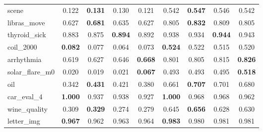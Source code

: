 \begin{figure}[ht]
\begin{tabular}{p{22mm}|*4{p{14mm}}|*4{p{14mm}}}
        scene&\multicolumn{1}{c}{0.122}&\multicolumn{1}{c}{\textbf{0.131}}&\multicolumn{1}{c}{0.130}&\multicolumn{1}{c|}{0.121}&\multicolumn{1}{c}{0.542}&\multicolumn{1}{c}{\textbf{0.547}}&\multicolumn{1}{c}{0.546}&\multicolumn{1}{c}{0.542}\\
        libras\_move&\multicolumn{1}{c}{0.627}&\multicolumn{1}{c}{\textbf{0.681}}&\multicolumn{1}{c}{0.635}&\multicolumn{1}{c|}{0.627}&\multicolumn{1}{c}{0.805}&\multicolumn{1}{c}{\textbf{0.832}}&\multicolumn{1}{c}{0.809}&\multicolumn{1}{c}{0.805}\\
        thyroid\_sick&\multicolumn{1}{c}{0.883}&\multicolumn{1}{c}{0.875}&\multicolumn{1}{c}{\textbf{0.894}}&\multicolumn{1}{c|}{0.892}&\multicolumn{1}{c}{0.938}&\multicolumn{1}{c}{0.934}&\multicolumn{1}{c}{\textbf{0.944}}&\multicolumn{1}{c}{0.943}\\
        coil\_2000&\multicolumn{1}{c}{\textbf{0.082}}&\multicolumn{1}{c}{0.077}&\multicolumn{1}{c}{0.064}&\multicolumn{1}{c|}{0.073}&\multicolumn{1}{c}{\textbf{0.524}}&\multicolumn{1}{c}{0.522}&\multicolumn{1}{c}{0.515}&\multicolumn{1}{c}{0.520}\\
        arrhythmia&\multicolumn{1}{c}{0.619}&\multicolumn{1}{c}{0.627}&\multicolumn{1}{c}{0.646}&\multicolumn{1}{c|}{\textbf{0.668}}&\multicolumn{1}{c}{0.801}&\multicolumn{1}{c}{0.805}&\multicolumn{1}{c}{0.815}&\multicolumn{1}{c}{\textbf{0.826}}\\
        solar\_flare\_m0&\multicolumn{1}{c}{0.020}&\multicolumn{1}{c}{0.019}&\multicolumn{1}{c}{0.021}&\multicolumn{1}{c|}{\textbf{0.067}}&\multicolumn{1}{c}{0.493}&\multicolumn{1}{c}{0.493}&\multicolumn{1}{c}{0.495}&\multicolumn{1}{c}{\textbf{0.518}}\\
        oil&\multicolumn{1}{c}{0.342}&\multicolumn{1}{c}{\textbf{0.431}}&\multicolumn{1}{c}{0.421}&\multicolumn{1}{c|}{0.380}&\multicolumn{1}{c}{0.661}&\multicolumn{1}{c}{\textbf{0.707}}&\multicolumn{1}{c}{0.701}&\multicolumn{1}{c}{0.680}\\
        car\_eval\_4&\multicolumn{1}{c}{\textbf{1.000}}&\multicolumn{1}{c}{0.937}&\multicolumn{1}{c}{0.938}&\multicolumn{1}{c|}{0.927}&\multicolumn{1}{c}{\textbf{1.000}}&\multicolumn{1}{c}{0.968}&\multicolumn{1}{c}{0.968}&\multicolumn{1}{c}{0.962}\\
        wine\_quality&\multicolumn{1}{c}{0.309}&\multicolumn{1}{c}{\textbf{0.329}}&\multicolumn{1}{c}{0.274}&\multicolumn{1}{c|}{0.279}&\multicolumn{1}{c}{0.645}&\multicolumn{1}{c}{\textbf{0.656}}&\multicolumn{1}{c}{0.628}&\multicolumn{1}{c}{0.630}\\
        letter\_img&\multicolumn{1}{c}{\textbf{0.967}}&\multicolumn{1}{c}{0.962}&\multicolumn{1}{c}{0.963}&\multicolumn{1}{c|}{0.964}&\multicolumn{1}{c}{\textbf{0.983}}&\multicolumn{1}{c}{0.980}&\multicolumn{1}{c}{0.981}&\multicolumn{1}{c}{0.981}\\

\end{tabular}
\end{figure}
